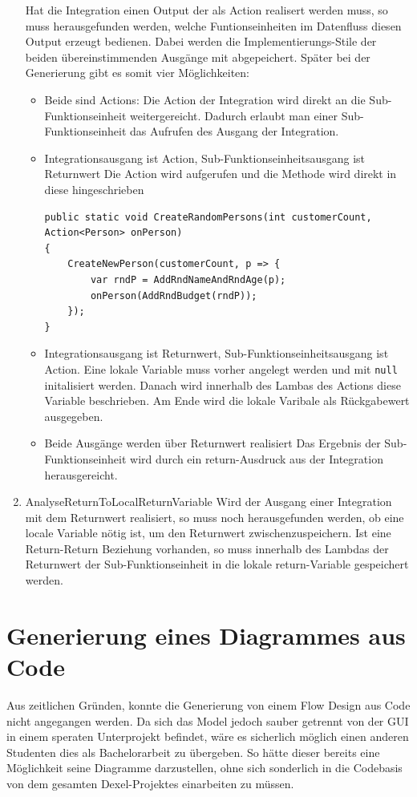 \begin{enumerate}
		Hat die Integration einen Output der als Action realisert werden muss, so
		muss herausgefunden werden, welche Funtionseinheiten im Datenfluss diesen
		Output erzeugt bedienen. Dabei werden die Implementierungs-Stile der
		beiden übereinstimmenden Ausgänge mit abgepeichert. Später bei der
		Generierung gibt es somit vier Möglichkeiten:
		\begin{itemize}
			\item Beide sind Actions:
			Die Action der Integration wird direkt an die Sub-Funktionseinheit
			weitergereicht. Dadurch erlaubt man einer Sub-Funktionseinheit das
			Aufrufen des Ausgang der Integration.
			\item Integrationsausgang ist Action, Sub-Funktionseinheitsausgang ist
			Returnwert 
			Die Action wird aufgerufen und die Methode wird direkt in diese
			hingeschrieben
			\begin{lstlisting}[caption=Action-Return-Beziehung]
public static void CreateRandomPersons(int customerCount, Action<Person> onPerson)
{
	CreateNewPerson(customerCount, p => {
		var rndP = AddRndNameAndRndAge(p);
		onPerson(AddRndBudget(rndP));
	});
}
			\end{lstlisting}
			\item Integrationsausgang ist Returnwert, Sub-Funktionseinheitsausgang ist
			Action.
			Eine lokale Variable muss vorher angelegt werden und mit \texttt{null}
			initalisiert werden. Danach wird innerhalb des Lambas des Actions diese
			Variable beschrieben. Am Ende wird die lokale Varibale als Rückgabewert
			ausgegeben.
			\item Beide Ausgänge werden über Returnwert realisiert 
		    Das Ergebnis der Sub-Funktionseinheit wird durch ein return-Ausdruck aus der Integration herausgereicht.
		\end{itemize}
			\item AnalyseReturnToLocalReturnVariable
			Wird der Ausgang einer Integration mit dem Returnwert realisiert, so muss noch herausgefunden werden, ob eine locale Variable nötig ist, um den Returnwert zwischenzuspeichern. Ist eine Return-Return Beziehung vorhanden, so muss innerhalb des Lambdas der Returnwert der Sub-Funktionseinheit in die lokale return-Variable gespeichert werden.
	\end{enumerate}
	



\section{Generierung eines Diagrammes aus Code}

Aus zeitlichen Gründen, konnte die Generierung von einem Flow Design aus Code nicht angegangen werden. 
Da sich das Model jedoch sauber getrennt von der GUI in
einem speraten Unterprojekt befindet, wäre es sicherlich möglich einen anderen
Studenten dies als Bachelorarbeit zu übergeben. So hätte dieser bereits eine
Möglichkeit seine Diagramme darzustellen, ohne sich sonderlich in die
Codebasis von dem gesamten Dexel-Projektes einarbeiten zu müssen.